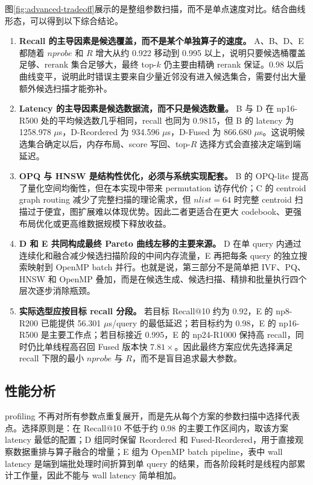 \documentclass[a4paper]{article}
\begin{document}
图\ref{fig:advanced-tradeoff}展示的是整组参数扫描，而不是单点速度对比。结合曲线形态，可以得到以下综合结论。
\begin{enumerate}
\item \textbf{Recall 的主导因素是候选覆盖，而不是某个单独算子的速度。} A、B、D、E 都随着 $nprobe$ 和 $R$ 增大从约 0.922 移动到 0.995 以上，说明只要候选桶覆盖足够、rerank 集合足够大，最终 top-$k$ 仍主要由精确 rerank 保证。0.98 以后曲线变平，说明此时错误主要来自少量近邻没有进入候选集合，需要付出大量额外候选扫描才能弥补。
\item \textbf{Latency 的主导因素是候选数据流，而不只是候选数量。} B 与 D 在 np16-R500 处的平均候选数几乎相同，recall 也同为 0.9815，但 B 的 latency 为 1258.978 $\mu$s，D-Reordered 为 934.596 $\mu$s，D-Fused 为 866.680 $\mu$s。这说明候选集合确定以后，内存布局、score 写回、top-$R$ 选择方式会直接决定端到端延迟。
\item \textbf{OPQ 与 HNSW 是结构性优化，必须与系统实现配套。} B 的 OPQ-lite 提高了量化空间均衡性，但在本实现中带来 permutation 访存代价；C 的 centroid graph routing 减少了完整扫描的理论需求，但 $nlist=64$ 时完整 centroid 扫描过于便宜，图扩展难以体现优势。因此二者更适合在更大 codebook、更强布局优化或更高维数据规模下释放收益。
\item \textbf{D 和 E 共同构成最终 Pareto 曲线左移的主要来源。} D 在单 query 内通过连续化和融合减少候选扫描阶段的中间内存流量，E 再把每条 query 的独立搜索映射到 OpenMP batch 并行。也就是说，第三部分不是简单把 IVF、PQ、HNSW 和 OpenMP 叠加，而是在候选生成、候选扫描、精排和批量执行四个层次逐步消除瓶颈。
\item \textbf{实际选型应按目标 recall 分段。} 若目标 Recall@10 约为 0.92，E 的 np8-R200 已能提供 56.301 $\mu$s/query 的最低延迟；若目标约为 0.98，E 的 np16-R500 是主要工作点；若目标接近 0.995，E 的 np24-R1000 保持高 recall，同时仍比单线程高召回 Fused 版本快 $7.81\times$。因此最终方案应优先选择满足 recall 下限的最小 $nprobe$ 与 $R$，而不是盲目追求最大参数。
\end{enumerate}

\subsection{性能分析}

profiling 不再对所有参数点重复展开，而是先从每个方案的参数扫描中选择代表点。选择原则是：在 Recall@10 不低于约 0.98 的主要工作区间内，取该方案 latency 最低的配置；D 组同时保留 Reordered 和 Fused-Reordered，用于直接观察数据重排与算子融合的增量；E 组为 OpenMP batch pipeline，表中 wall latency 是端到端批处理时间折算到单 query 的结果，而各阶段耗时是线程内部累计工作量，因此不能与 wall latency 简单相加。
\end{document}
